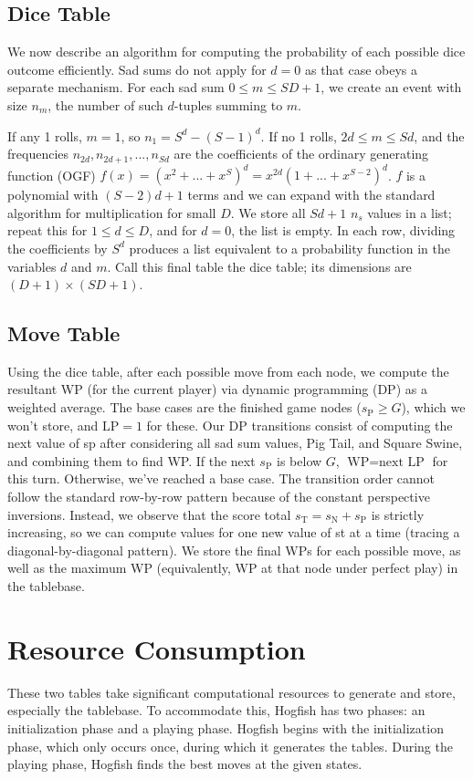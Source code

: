 \documentclass[12 pt]{article}
\newcommand{\smn}{s_\mathrm{N}}
\newcommand{\smp}{s_\mathrm{P}}
\newcommand{\smt}{s_\mathrm{T}}
\begin{document}
		\subsection{Dice Table}
			We now describe an algorithm for computing the probability of each possible dice outcome efficiently. Sad sums do not apply for $d = 0$ as that case obeys a separate mechanism. For each sad sum $0 \le m \le SD + 1$, we create an event with size $n_m$, the number of such $d$-tuples summing to $m$.

			If any 1 rolls, $m = 1$, so $n_1 = S^d - (S - 1)^d$. If no 1 rolls, $2d \le m \le Sd$, and the frequencies $n_{2d}, n_{2d + 1}, ..., n_{Sd}$ are the coefficients of the ordinary generating function (OGF) $f(x) = (x^2 + ... + x^S) ^ d = x^{2d}(1 + ... + x^{S - 2}) ^ d$. $f$ is a polynomial with $(S - 2)d + 1$ terms and we can expand with the standard algorithm for multiplication for small $D$. We store all $Sd + 1$ $n_s$ values in a list; repeat this for $1 \le d \le D$, and for $d = 0$, the list is empty. In each row, dividing the coefficients by $S^d$ produces a list equivalent to a probability function in the variables $d$ and $m$. Call this final table the dice table; its dimensions are $(D + 1) \times (SD + 1)$.
		
		\subsection{Move Table}
			Using the dice table, after each possible move from each node, we compute the resultant WP (for the current player) via dynamic programming (DP) as a weighted average. The base cases are the finished game nodes ($\smp \ge G$), which we won't store, and $\text{LP} = 1$ for these. Our DP transitions consist of computing the next value of sp after considering all sad sum values, Pig Tail, and Square Swine, and combining them to find WP. If the next $\smp$ is below $G$, $\text{WP} = \text{next LP}$ for this turn. Otherwise, we've reached a base case. The transition order cannot follow the standard row-by-row pattern because of the constant perspective inversions. Instead, we observe that the score total $\smt = \smn + \smp$ is strictly increasing, so we can compute values for one new value of st at a time (tracing a diagonal-by-diagonal pattern). We store the final WPs for each possible move, as well as the maximum WP (equivalently, WP at that node under perfect play) in the tablebase.

	\section{Resource Consumption}
		These two tables take significant computational resources to generate and store, especially the tablebase. To accommodate this, Hogfish has two phases: an initialization phase and a playing phase. Hogfish begins with the initialization phase, which only occurs once, during which it generates the tables. During the playing phase, Hogfish finds the best moves at the given states.
\end{document}
